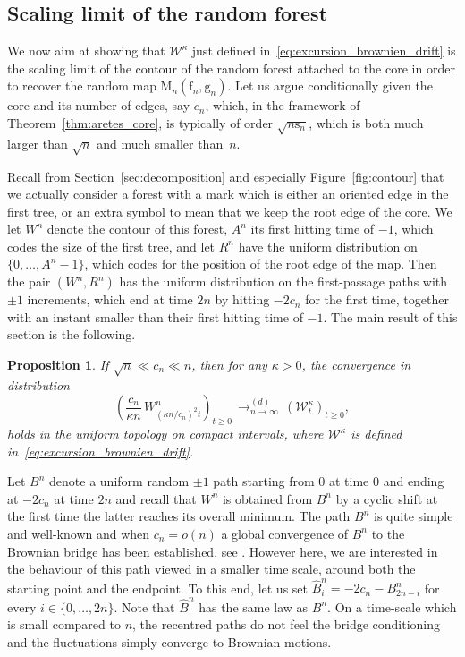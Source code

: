 \documentclass[JEP,XML,SOM,Unicode,NoFloatCountersInSection,NoEqCountersInSection]{cedram}
\theoremstyle{plain}
\newtheorem{proposition}[theorem]{Proposition}
\theoremstyle{definition}
\theoremstyle{remark}
\newcommand{\Map}{\mathrm{M}}
\newcommand{\face}{\mathrm{f}}
\newcommand{\gen}{\mathrm{g}}
\newcommand{\spar}{\mathrm{s}}
\newcommand{\cvloi}[1][n]{\,\mathop{\longrightarrow}^{(d)}_{#1 \to \infty}\,}
\begin{document}
\subsection{Scaling limit of the random forest}

We now aim at showing that $\mathcal{W}^\kappa$ just defined in~\eqref{eq:excursion_brownien_drift} is the scaling limit of the contour of the random forest attached to the core in order to recover the random map $\Map_n(\face_n, \gen_n)$.
Let us argue conditionally given the core and its number of edges, say $c_n$, which, in the framework of Theorem~\ref{thm:aretes_core}, is typically of order $\sqrt{n \spar_n}$, which is both much larger than $\sqrt{n}$ and much smaller than~$n$.

Recall from Section~\ref{sec:decomposition} and especially Figure~\ref{fig:contour} that we actually consider a forest with a mark which is either an oriented edge in the first tree, or an extra symbol to mean that we keep the root edge of the core. We let $W^n$ denote the contour of this forest, $A^n$ its first hitting time of $-1$, which codes the size of the first tree, and let $R^n$ have the uniform distribution on $\{0, \dots, A^n-1\}$, which codes for the position of the root edge of the map. Then the pair $(W^n, R^n)$ has the uniform distribution on the first-passage paths with $\pm1$ increments, which end at time $2n$ by hitting $-2c_n$ for the first time, together with an instant smaller than their first hitting time of $-1$.
The main result of this section is the following.

\begin{proposition}\label{prop:cv_contour_brownien_drift}
If $\sqrt{n} \ll c_n \ll n$, then for any $\kappa >0$, the convergence in distribution
\[
\left(\frac{c_{n}}{\kappa n}\, W^{n}_{(\kappa n/c_{n})^2 t}\right)_{t \ge 0}
\cvloi \left(\mathcal{W}^{\kappa}_{t}\right)_{t \ge 0},
\]
holds in the uniform topology on compact intervals, where $\mathcal{W}^\kappa$ is defined in~\eqref{eq:excursion_brownien_drift}.
\end{proposition}

Let $B^n$ denote a uniform random $\pm1$ path starting from $0$ at time $0$ and ending at $-2c_n$ at time $2n$ and recall that $W^n$ is obtained from $B^n$ by a cyclic shift at the first time the latter reaches its overall minimum.
The path $B^n$ is quite simple and well-known and when $c_n=o(n)$ a global convergence of $B^n$ to the Brownian bridge has been established, see \eg \cite[Th.\,20.7]{Ald85}.
However here, we are interested in the behaviour of this path viewed in a smaller time scale, around both the starting point and the endpoint. To this end, let us set $\widehat{B}^{n}_{i} = -2c_{n}-B^{n}_{2n-i}$ for every $i \in \{0, \dots, 2n\}$. Note that $\widehat{B}^{n}$ has the same law as $B^{n}$.
On a time-scale which is small compared to $n$, the recentred paths do not feel the bridge conditioning and the fluctuations simply converge to Brownian motions.
\end{document}
